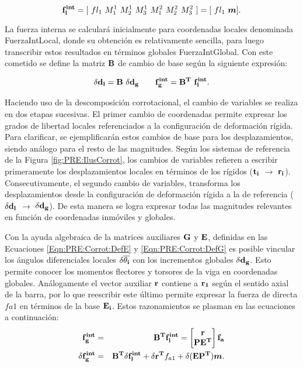 \begin{equation}\label{Eqn:PRE:FuerzElem}
\bf{ f_l^{int}} =\text{$[~fl_1 ~M^1_1~ M^1_2~ M^1_3~ M^2_1~ M^2_2~ M^2_3~]$} = [\text{$~fl_1$}~\boldsymbol{m}].
\end{equation}

La fuerza interna se calculará inicialmente para coordenadas locales denominada \gls{FuerzaIntLocal}, donde su obtención es relativamente sencilla, para luego transcribir estos resultados en términos globales \gls{FuerzaIntGlobal}. Con este cometido se define la matriz $\bf{B}$ de cambio de base según la siguiente expresión:

\begin{equation}\label{Eqn:PRE:CambioCoord}
	\bf{\delta d_l}=\bf{B}~\bf{\delta d_g} ~~~~~~ 	\bf{f_g^{int}}=\bf{B}^T~\bf{ f_l^{int}}.
\end{equation}

Haciendo uso de la descomposición corrotacional, el cambio de variables se realiza en dos etapas sucesivas. El primer cambio de coordenadas permite expresar los grados de libertad locales referenciados a la configuración de deformación rígida. Para clarificar, se ejemplificarán estos cambios de base para los desplazamientos, siendo análogo para el resto de las magnitudes. Según los sistemas de referencia de la Figura \ref{fig:PRE:IlusCorrot}, los cambios de variables refieren a escribir primeramente los desplazamientos locales en términos de los rígidos ($\bf{t_i}$ $\rightarrow$ $\bf{r_i}$). Consecutivamente, el segundo cambio de variables, transforma los desplazamientos desde la configuración de deformación rígida a la de referencia ($\delta \bf{d_l}$ $\rightarrow$ $\delta \bf{d_g}$). De esta manera se logra expresar todas las magnitudes relevantes en función de coordenadas inmóviles y globales.

Con la ayuda algebraica de la matrices auxiliares $\bf{G}$ y $\bf{E}$, definidas en las Ecuaciones \eqref{Eqn:PRE:Corrot:DefE} y \eqref{Eqn:PRE:Corrot:DefG} es posible vincular los ángulos diferenciales locales $\delta\bf{\overline{\theta_i}}$ con los incrementos globales $\delta \bf{d_g}$. Esto permite conocer los momentos flectores y torsores de la viga en coordenadas globales. Análogamente el vector auxiliar $\bf{r}$ contiene a $\bf{r}_1$ según el sentido axial de la barra, por lo que reescribir este último permite expresar la fuerza de directa $fa1$  en términos de la base $\bf{E_i}$. Estos razonamientos se plasman en las ecuaciones a continuación:
\begin{eqnarray}\label{Eqn:PRE:FuerzaInterna}
	\bf{f_g^{int}}&=&\bf{B}^T\bf{f_l^{int}}= \begin{bmatrix}
		\bf{r}\\
		\bf{PE^T}
	\end{bmatrix}\bf{f_a}\\
    \label{Eqn:PRE:DifFuerzaInterna}
	\delta\bf{f_g^{int}}&=&\bf{B}^T\delta\bf{f_l^{int}}+\delta\bf{r}^T \text{$f_{a1}$}+\delta(\bf{EP^T}) \boldsymbol{m}.
\end{eqnarray}

